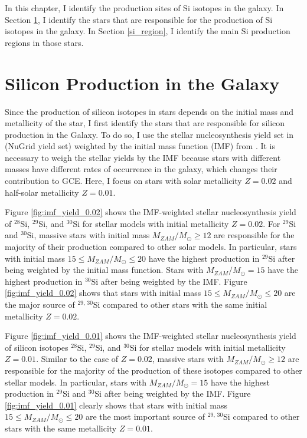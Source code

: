\documentclass{brandeis-thesis3.2}
\def \msun {M_{\odot}}
\newcommand{\iso}[2]{$^{#1}${#2}}
\begin{document}
In this chapter, I identify the production sites of Si isotopes in the galaxy. In Section \ref{si_star}, I identify the stars that are responsible for the production of Si isotopes in the galaxy. In Section \ref{si_region}, I identify the main Si production regions in those stars.

\section{Silicon Production in the Galaxy} \label{si_star}
Since the production of silicon isotopes in stars depends on the initial mass and metallicity of the star, I first identify the stars that are responsible for silicon production in the Galaxy. To do so, I use the stellar nucleosynthesis yield set in \citealt{Ritter_2018} (NuGrid yield set) weighted by the initial mass function (IMF) from \cite{kroupa01}. It is necessary to weigh the stellar yields by the IMF because stars with different masses have different rates of occurrence in the galaxy, which changes their contribution to GCE. Here, I focus on stars with solar metallicity $Z=0.02$ and half-solar metallicity $Z=0.01$. 

Figure \ref{fig:imf_yield_0.02} shows the IMF-weighted stellar nucleosynthesis yield of \iso{28}{Si}, \iso{29}{Si}, and \iso{30}{Si} for stellar models with initial metallicity $Z=0.02$. For \iso{29}{Si} and \iso{30}{Si}, massive stars with initial mass $M_{ZAM}/\msun \geq 12$ are responsible for the majority of their production compared to other solar models. In particular, stars with initial mass $15 \leq M_{ZAM}/\msun \leq 20$ have the highest production in \iso{29}{Si} after being weighted by the initial mass function. Stars with $M_{ZAM}/\msun = 15$ have the highest production in \iso{30}{Si} after being weighted by the IMF. Figure \ref{fig:imf_yield_0.02} shows that stars with initial mass $15\leq M_{ZAM}/\msun \leq 20$ are the major source of \iso{29, \, 30}{Si} compared to other stars with the same initial metallicity $Z=0.02$.

Figure \ref{fig:imf_yield_0.01} shows the IMF-weighted stellar nucleosynthesis yield of silicon isotopes \iso{28}{Si}, \iso{29}{Si}, and \iso{30}{Si} for stellar models with initial metallicity $Z=0.01$. Similar to the case of $Z=0.02$, massive stars with $M_{ZAM}/\msun \geq 12$ are responsible for the majority of the production of these isotopes compared to other stellar models. In particular, stars with $M_{ZAM}/\msun = 15$ have the highest production in \iso{29}{Si} and \iso{30}{Si} after being weighted by the IMF. Figure \ref{fig:imf_yield_0.01} clearly shows that stars with initial mass $15\leq M_{ZAM}/\msun \leq 20$ are the most important source of \iso{29,\, 30}{Si} compared to other stars with the same metallicity $Z=0.01$. 
\end{document}
